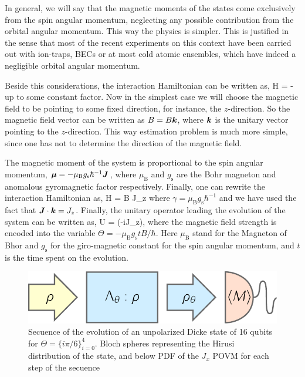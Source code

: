In general, we will say that the magnetic moments of the states come exclusively from the spin angular momentum, neglecting any possible contribution from the orbital angular momentum.
This way the physics is simpler.
This is justified in the sense that most of the recent experiments on this context have been carried out with ion-traps, BECs or at most cold atomic ensembles, which have indeed a negligible orbital angular momentum.

Beside this considerations, the interaction Hamiltonian can be written as,
\be
  H = - \bs{\mu} \cdot {}
\ee
up to some constant factor.
Now in the simplest case we will choose the magnetic field to be pointing to some fixed direction, for instance, the $z$-direction.
So the magnetic field vector can be written as ${B}=B\boldsymbol{k}$, where $\boldsymbol{k}$ is the unitary vector pointing to the $z$-direction.
This way estimation problem is much more simple, since one has not to determine the direction of the magnetic field.

The magnetic moment of the system is proportional to the spin angular momentum, $\boldsymbol{\mu}=-\mu_\text{B} g_{\text{s}}\hbar^{-1} \boldsymbol{J}$, where $\mu_{\text{B}}$ and $g_{\text{s}}$ are the Bohr magneton and anomalous gyromagnetic factor respectively.
Finally, one can rewrite the interaction Hamiltonian as,
\be
  H = \gamma B J_z
\ee
where $\gamma = \mu_\text{B} g_{\text{s}}\hbar^{-1}$ and we have used the fact that $\boldsymbol{J}\cdot\boldsymbol{k}=J_z$.
Finally, the unitary operator leading the evolution of the system can be written as,
\be
  U = \exp(-i\Theta J_z),
\ee
where the magnetic field strength is encoded into the variable $\Theta=-\mu_\text{B} g_\text{s} t B/\hbar$.
Here $\mu_\text{B}$ stand for the Magneton of Bhor and $g_\text{s}$ for the giro-magnetic constant for the spin angular momentum, and $t$ is the time spent on the evolution.

\begin{figure}
  \centering
  \includegraphics[scale=.85]{img/preparation-encoding-estimation.pdf}
  \caption{Secuence of the evolution of an unpolarized Dicke state of 16 qubits for $\Theta=\{i\pi/6\}_{i=0}^4$. Bloch spheres representing the Hirusi distribution of the state, and below PDF of the $J_x$ POVM for each step of the secuence}
  \label{fig:bg-preparation-encoding-estimation}
\end{figure}

